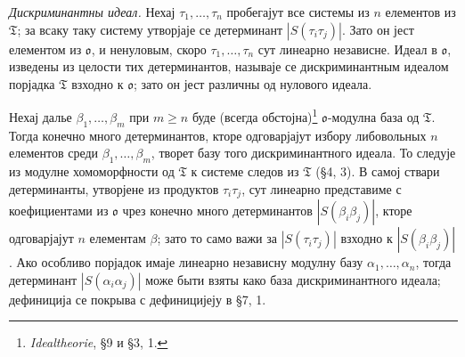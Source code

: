 \documentclass[11pt]{article}
\newcommand{\mo}{\mathfrak{o}}
\newcommand{\mT}{\mathfrak{T}}
\begin{document}
\setcounter{footnote}{34}

\noindent \emph{Дискриминантны идеал.} Нехај $\tau_1,\ldots,\tau_n$ пробегајут все системы из $n$ елементов из $\mT$; за всаку таку систему утворјаје се детерминант $|S(\tau_i\tau_j)|$. Зато он јест елементом из $\mo$, и ненуловым, скоро $\tau_1,\ldots,\tau_n$ сут линеарно независне. Идеал в $\mo$, изведены из целости тих детерминантов, называје се дискриминантным идеалом порјадка $\mT$ взходно к $\mo$; зато он јест различны од нулового идеала.

Нехај далье $\beta_1,\ldots,\beta_m$ при $m\ge n$ буде (всегда обстојна)\footnote{\emph{Idealtheorie}, §9 и §3, 1.} $\mo$-модулна база од $\mT$. Тогда конечно много детерминантов, кторе одговарјајут избору либовольных $n$ елементов среди $\beta_1,\ldots,\beta_m$, творет базу того дискриминантного идеала. То следује из модулне хомоморфности од $\mT$ к системе следов из $\mT$ (§4, 3). В самој ствари детерминанты, утворјене из продуктов $\tau_i\tau_j$, сут линеарно представиме с коефициентами из $\mo$ чрез конечно много детерминантов $|S(\beta_i\beta_j)|$, кторе одговарјајут $n$ елементам $\beta$; зато то само важи за $|S(\tau_i\tau_j)|$ взходно к $|S(\beta_i\beta_j)|$. Ако особливо порјадок имаје линеарно независну модулну базу $\alpha_1,\ldots,\alpha_n$, тогда детерминант $|S(\alpha_i\alpha_j)|$ може быти взяты како база дискриминантного идеала; дефиниција се покрыва с дефиницијеју в §7, 1.
\end{document}
